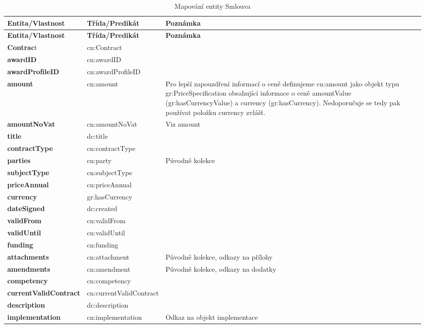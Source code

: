\begin{center}
\begin{longtable}{lp{30mm}p{65mm}}
\label{grid_mlmmh} \\
\multicolumn{1}{l}{\textbf{Entita/Vlastnost}} & 
\multicolumn{1}{l}{\textbf{Třída/Predikát}} & 
\multicolumn{1}{l}{\textbf{Poznámka}} \\ \hline 
\endfirsthead
\multicolumn{1}{l}{\textbf{Entita/Vlastnost}} & 
\multicolumn{1}{l}{\textbf{Třída/Predikát}} & 
\multicolumn{1}{l}{\textbf{Poznámka}} \\ \hline 
\hline
\endhead
\endfoot
\caption{Mapování entity Smlouva}
\endlastfoot
\textbf{Contrac}t & cn:Contract \\
\textbf{awardID} & cn:awardID \\
\textbf{awardProfileID} & cn:awardProfileID \\
\textbf{amount} & cn:amount & Pro lepší zapouzdření informací o ceně definujeme cn:amount jako objekt typu gr:PriceSpecification obsahující informace o ceně amountValue (gr:hasCurrencyValue) a currency (gr:hasCurrency). Nedoporučuje se tedy pak používat položku currency zvlášť. \\
\textbf{amountNoVat} & cn:amountNoVat & Viz amount \\
\textbf{title} & dc:title \\
\textbf{contractType} & cn:contractType \\
\textbf{parties} & cn:party & Původně kolekce\\
\textbf{subjectType} & cn:subjectType \\
\textbf{priceAnnual} & cn:priceAnnual \\
\textbf{currency} & gr:hasCurrency \\
\textbf{dateSigned} & dc:created \\
\textbf{validFrom} & cn:validFrom \\
\textbf{validUntil} & cn:validUntil \\
\textbf{funding} & cn:funding \\
\textbf{attachments} & cn:attachment & Původně kolekce, odkazy na přílohy  \\
\textbf{amendments} & cn:amendment & Původně kolekce, odkazy na dodatky \\
\textbf{competency} & cn:competency \\
\textbf{currentValidContract} & cn:currentValidContract \\
\textbf{description} & dc:description \\
\textbf{implementation} & cn:implementation & Odkaz na objekt implementace \\
\end{longtable}
\end{center}

